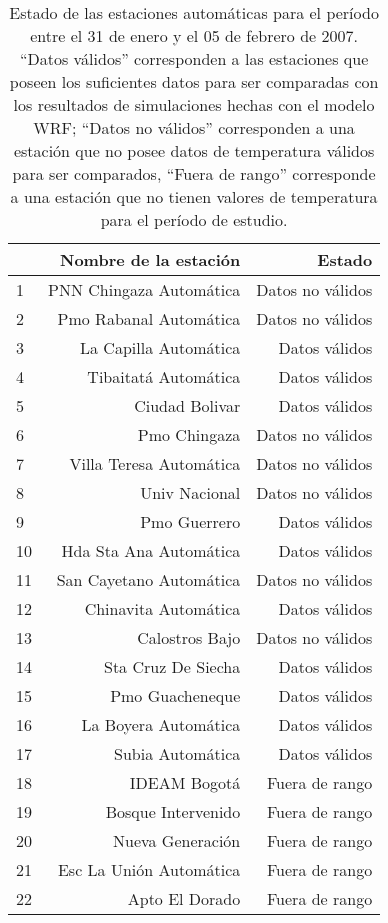 \begin{table}[H]
\centering
\caption{Estado de las estaciones automáticas para el período entre el 31 de enero y el 05 de febrero de 2007. ``Datos válidos'' corresponden a las estaciones que poseen los suficientes datos para ser comparadas con los resultados de simulaciones hechas con el modelo WRF; ``Datos no válidos'' corresponden a una estación que no posee datos de temperatura válidos para ser comparados, ``Fuera de rango'' corresponde a una estación que no tienen valores de temperatura para el período de estudio.}
\label{tab:estado_hydras}
\begin{tabular}{lrr}
\toprule
{} &       Nombre de la estación & Estado\\
\midrule
1  &       PNN Chingaza Automática  & Datos no válidos\\
2  &   Pmo Rabanal Automática  & Datos no válidos\\
3  &         La Capilla Automática  & Datos válidos\\
4  &     Tibaitatá Automática  & Datos válidos\\
5  &           Ciudad Bolivar  & Datos válidos\\
6  &             Pmo Chingaza  & Datos no válidos\\
7  &  Villa Teresa Automática  & Datos no válidos\\
8  &            Univ Nacional  & Datos no válidos\\
9  &             Pmo Guerrero  & Datos válidos\\
10 &        Hda Sta Ana Automática  & Datos válidos\\
11 &       San Cayetano Automática  & Datos no válidos\\
12 &     Chinavita Automática  & Datos válidos\\
13 &           Calostros Bajo  & Datos no válidos\\
14 &       Sta Cruz De Siecha  & Datos válidos\\
15 &          Pmo Guacheneque  & Datos válidos\\
16 &     La Boyera Automática  & Datos válidos\\
17 &         Subia Automática  & Datos válidos\\
18 &             IDEAM Bogotá  & Fuera de rango\\
19 &       Bosque Intervenido  & Fuera de rango\\
20 &         Nueva Generación  & Fuera de rango\\
21 &  Esc La Unión Automática  & Fuera de rango\\
22 &           Apto El Dorado  & Fuera de rango\\

\bottomrule
\end{tabular}
\end{table}


